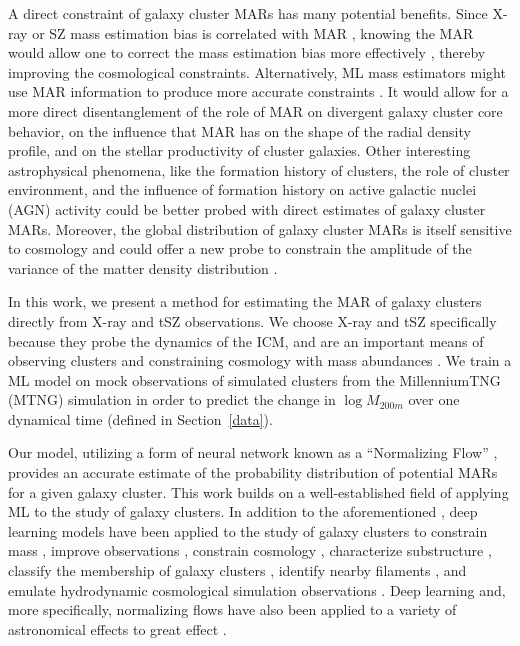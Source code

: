 \documentclass[twocolumn, linenumbers, 11pt]{aastex63}%
\begin{document}
A direct constraint of galaxy cluster MARs has many potential benefits. Since X-ray or SZ mass estimation bias is correlated with MAR \citep{Nelson2012,Nelson2014a,Nelson2014b}, knowing the MAR would allow one to correct the mass estimation bias more effectively \citep{Shi2016}, thereby improving the cosmological constraints. Alternatively, ML mass estimators might use MAR information to produce more accurate constraints \citep[e.g.,][]{Ho_2023}. It would allow for a more direct disentanglement of the role of MAR on divergent galaxy cluster core behavior, on the influence that MAR has on the shape of the radial density profile, and on the stellar productivity of cluster galaxies. Other interesting astrophysical phenomena, like the formation history of clusters, the role of cluster environment, and the influence of formation history on active galactic nuclei (AGN) activity could be better probed with direct estimates of galaxy cluster MARs. Moreover, the global distribution of galaxy cluster MARs is itself sensitive to cosmology and could offer a new probe to constrain the amplitude of the variance of the matter density distribution \citep[][]{Amoura_2024}.

In this work, we present a method for estimating the MAR of galaxy clusters directly from X-ray and tSZ observations. We choose X-ray and tSZ specifically because they probe the dynamics of the ICM, and are an important means of observing clusters \citep[e.g.,][]{Hilton_2021, SPT_catalog, Bulbul_2024} and constraining cosmology with mass abundances \citep{SPT_Abundances, eROSITA_Cluster_Abundances_2024}. We train a ML model on mock observations of simulated clusters from the MillenniumTNG (MTNG) simulation \citep{MTNG_1, MTNG_2, MTNG_3, MTNG_4, MTNG_5, MTNG_6, MTNG_7, MTNG_8, MTNG_9, MTNG_10} in order to predict the change in $\log M_{200m}$ over one dynamical time (defined in Section~\ref{data}). 

Our model, utilizing a form of neural network known as a  ``Normalizing Flow'' \citep{Papamakarios_2019}, provides an accurate estimate of the probability distribution of potential MARs for a given galaxy cluster. This work builds on a well-established field of applying ML to the study of galaxy clusters. In addition to the aforementioned \citet{Arendt_2024}, deep learning models have been applied to the study of galaxy clusters to constrain mass \citep{Ntampaka2019, Ho_2023, Krippendorf_2024}, improve observations \citep{Soltis_2022}, constrain cosmology \citep{Qiu_2024}, characterize substructure \citep{Henriksen_2024}, classify the membership of galaxy clusters \citep{Farid2023}, identify nearby filaments \citep{Weaver_2023}, and emulate hydrodynamic cosmological simulation observations \citep{Rothschild_2022}. Deep learning and, more specifically, normalizing flows have also been applied to a variety of astronomical effects to great effect \citep[e.g.,][]{Sweere_2022}.
\end{document}
